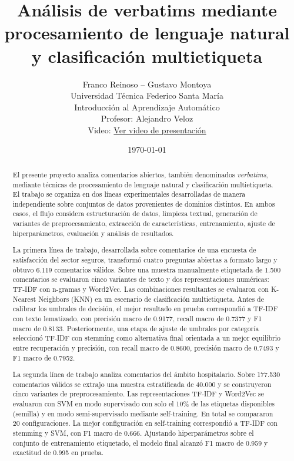 \documentclass[12pt,a4paper]{article}
\title{\textbf{Análisis de verbatims mediante procesamiento de lenguaje natural y clasificación multietiqueta}}
\author{
Franco Reinoso \quad -- \quad Gustavo Montoya\\[0.4em]
\small Universidad Técnica Federico Santa María\\
\small Introducción al Aprendizaje Automático\\
\small Profesor: Alejandro Veloz\\
\small Video: \href{https://drive.google.com/file/d/1ahWo57hS4awySdTNsfvNgicXud_ryyki/view?usp=drive_link}{Ver video de presentación}
}
\date{\today}
\begin{document}
\maketitle

\begin{abstract}
El presente proyecto analiza comentarios abiertos, también denominados \textit{verbatims}, mediante técnicas de procesamiento de lenguaje natural y clasificación multietiqueta. El trabajo se organiza en dos líneas experimentales desarrolladas de manera independiente sobre conjuntos de datos provenientes de dominios distintos. En ambos casos, el flujo considera estructuración de datos, limpieza textual, generación de variantes de preprocesamiento, extracción de características, entrenamiento, ajuste de hiperparámetros, evaluación y análisis de resultados.

La primera línea de trabajo, desarrollada sobre comentarios de una encuesta de satisfacción del sector seguros, transformó cuatro preguntas abiertas a formato largo y obtuvo 6.119 comentarios válidos. Sobre una muestra manualmente etiquetada de 1.500 comentarios se evaluaron cinco variantes de texto y dos representaciones numéricas: TF-IDF con n-gramas y Word2Vec. Las combinaciones resultantes se evaluaron con K-Nearest Neighbors (KNN) en un escenario de clasificación multietiqueta. Antes de calibrar los umbrales de decisión, el mejor resultado en prueba correspondió a TF-IDF con texto lematizado, con precisión macro de 0.9177, recall macro de 0.7377 y F1 macro de 0.8133. Posteriormente, una etapa de ajuste de umbrales por categoría seleccionó TF-IDF con stemming como alternativa final orientada a un mejor equilibrio entre recuperación y precisión, con recall macro de 0.8600, precisión macro de 0.7493 y F1 macro de 0.7952.

La segunda línea de trabajo analiza comentarios del ámbito hospitalario. Sobre 177.530 comentarios válidos se extrajo una muestra estratificada de 40.000 y se construyeron cinco variantes de preprocesamiento. Las representaciones TF-IDF y Word2Vec se evaluaron con SVM en modo supervisado con solo el 10\% de las etiquetas disponibles (semilla) y en modo semi-supervisado mediante self-training. En total se compararon 20 configuraciones. La mejor configuración en self-training correspondió a TF-IDF con stemming y SVM, con F1 macro de 0.666. Ajustando hiperparámetros sobre el conjunto de entrenamiento etiquetado, el modelo final alcanzó F1 macro de 0.959 y exactitud de 0.995 en prueba.
\end{abstract}
\end{document}
